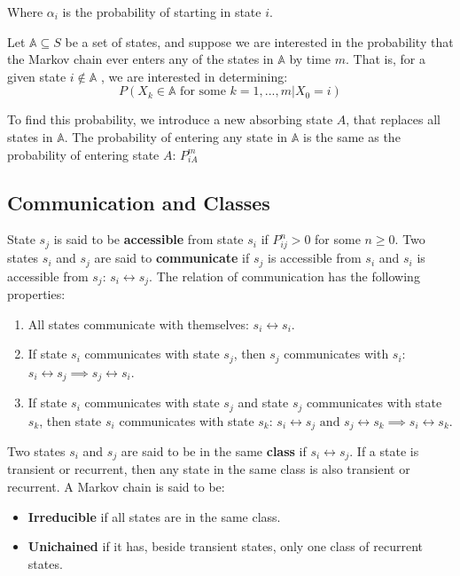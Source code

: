 \documentclass[12pt]{article}
\begin{document}
\noindent
Where $\alpha_i$ is the probability of starting in state $i$.

\newpage
\noindent
Let $\mathbb{A} \subseteq S$ be a set of states, and suppose we are interested in the probability that the Markov chain ever enters any of the states in $\mathbb{A}$ by time $m$.
That is, for a given state $i \notin \mathbb{A}$ , we are interested in determining:
\[ P(X_k \in \mathbb{A} \text{ for some } k = 1, ... , m | X_0 = i) \]

\noindent
To find this probability, we introduce a new absorbing state $A$, that replaces all states in $\mathbb{A}$.
The probability of entering any state in $\mathbb{A}$ is the same as the probability of entering state $A$: $P_{iA}^m$

\subsection{Communication and Classes}
State $s_j$ is said to be \textbf{accessible} from state $s_i$ if $P_{ij}^n > 0$ for some $n \geq 0$.
Two states $s_i$ and $s_j$ are said to \textbf{communicate} if $s_j$ is accessible from $s_i$ and $s_i$ is accessible from $s_j$: $s_i \leftrightarrow s_j$.
The relation of communication has the following properties:

\begin{enumerate}
    \item All states communicate with themselves: $s_i \leftrightarrow s_i$.
    \item If state $s_i$ communicates with state $s_j$, then $s_j$ communicates with $s_i$: $s_i \leftrightarrow s_j \implies s_j \leftrightarrow s_i$.
    \item If state $s_i$ communicates with state $s_j$ and state $s_j$ communicates with state $s_k$, then state $s_i$ communicates with state $s_k$: $s_i \leftrightarrow s_j \text{ and } s_j \leftrightarrow s_k \implies s_i \leftrightarrow s_k$.
\end{enumerate}

\noindent
Two states $s_i$ and $s_j$ are said to be in the same \textbf{class} if $s_i \leftrightarrow s_j$.
If a state is transient or recurrent, then any state in the same class is also transient or recurrent.
A Markov chain is said to be:

\begin{itemize}
    \item \textbf{Irreducible} if all states are in the same class.
    \item \textbf{Unichained} if it has, beside transient states, only one class of recurrent states.
\end{itemize}
\end{document}
